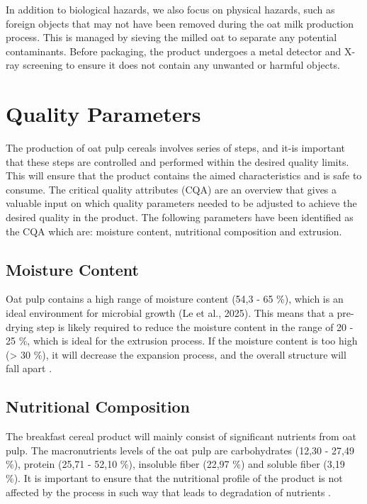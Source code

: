 \vline

In addition to biological hazards, we also focus on physical hazards, such as foreign objects that may not have been removed during the oat milk production process. This is managed by sieving the milled oat to separate any potential contaminants. Before packaging, the product undergoes a metal detector and X-ray screening to ensure it does not contain any unwanted or harmful objects.

\section{Quality Parameters}
The production of oat pulp cereals involves series of steps, and it-is important that these steps are controlled and performed within the desired quality limits. This will ensure that the product contains the aimed characteristics and is safe to consume. The critical quality attributes (CQA) are an overview that gives a valuable input on which quality parameters needed to be adjusted to achieve the desired quality in the product. The following parameters have been identified as the CQA which are: moisture content, nutritional composition and extrusion. 

\subsection*{Moisture Content}
Oat pulp contains a high range of moisture content (54,3 - 65 \%), which is an ideal environment for microbial growth (Le et al., 2025). This means that a pre-drying step is likely required to reduce the moisture content in the range of 20 - 25 \%, which is ideal for the extrusion process. If the moisture content is too high (> 30 \%), it will decrease the expansion process, and the overall structure will fall apart \cite*{RM_magdalena}.

\subsection*{Nutritional Composition}
The breakfast cereal product will mainly consist of significant nutrients from oat pulp. The macronutrients levels of the oat pulp are carbohydrates (12,30 - 27,49 \%), protein (25,71 - 52,10 \%), insoluble fiber (22,97 \%) and soluble fiber (3,19 \%). It is important to ensure that the nutritional profile of the product is not affected by the process in such way that leads to degradation of nutrients \cite*{05_article}.

